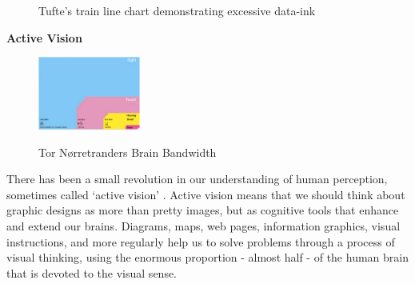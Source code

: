 \documentclass[a4paper,11pt,titlepage]{article}
\begin{document}
		\begin{figure}[H]
    			\centering	
    			\qquad
    			\caption{Tufte's train line chart demonstrating excessive data-ink}%
		\end{figure}
	
			
\textbf{Active Vision}
		
		\begin{figure}[H]
    			\centering	
			{{\includegraphics[width=0.3\textwidth]
    				{img/brain_bandwidth.png} 
    			}}%
    			\caption{Tor Nørretranders Brain Bandwidth}%
    		\label{fig:TufteExcellence}
		\end{figure}
		

 		There has been a small revolution in our understanding of human perception, sometimes called `active vision' \cite{Ware2010}. Active vision means that we should think about graphic designs as more than pretty images, but as cognitive tools that enhance and extend our brains. Diagrams, maps, web pages, information graphics, visual instructions, and more regularly help us to solve problems through a process of visual thinking, using the enormous proportion - almost half - of the human brain that is devoted to the visual sense.  
	
\end{document}

